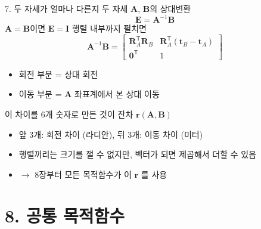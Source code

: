 \documentclass[aspectratio=169,11pt]{beamer}
\begin{document}
\begin{frame}{7. 두 자세가 얼마나 다른지}
  두 자세 $\mathbf{A}$, $\mathbf{B}$의 상대변환
  \[
    \mathbf{E} = \mathbf{A}^{-1}\mathbf{B}
  \]
  $\mathbf{A}=\mathbf{B}$이면 $\mathbf{E}=\mathbf{I}$
  \vfill
  행렬 내부까지 펼치면
  \[
    \mathbf{A}^{-1}\mathbf{B}
    =
    \begin{bmatrix}
      \mathbf{R}_A^{\mathsf T}\mathbf{R}_B
      & \mathbf{R}_A^{\mathsf T}(\mathbf{t}_B-\mathbf{t}_A) \\
      \mathbf{0}^{\mathsf T} & 1
    \end{bmatrix}
  \]
  \begin{itemize}
    \item 회전 부분 = 상대 회전
    \item 이동 부분 = $\mathbf{A}$ 좌표계에서 본 상대 이동
  \end{itemize}
  \vfill
  \begin{block}{이 차이를 $6$개 숫자로 만든 것이 잔차 $\mathbf{r}(\mathbf{A},\mathbf{B})$}
    \begin{itemize}
      \item 앞 $3$개: 회전 차이 (라디안), 뒤 $3$개: 이동 차이 (미터)
      \item 행렬끼리는 크기를 잴 수 없지만, 벡터가 되면 제곱해서 더할 수 있음
      \item $\rightarrow$ 8장부터 모든 목적함수가 이 $\mathbf{r}$ 를 사용
    \end{itemize}
  \end{block}
\end{frame}

\section{8. 공통 목적함수}
\end{document}

